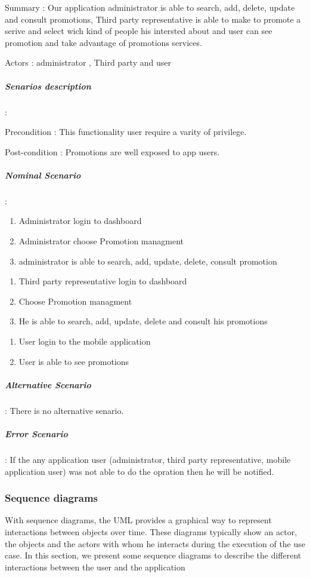 Summary : Our application administrator is able to search, add, delete, update and consult promotions,
Third party representative is able to make to promote a serive and select wich kind of people his intersted about and
user can see promotion and take advantage of promotions services.

Actors : administrator , Third party and user

\subparagraph{Senarios description} :
\label{sec:sec01}

Precondition : This functionality user require a varity of privilege.

Post-condition : Promotions are well exposed to app users.

\subparagraph{Nominal Scenario} :
\label{sec:sec01}

 \begin{enumerate}
   \item Administrator login to dashboard
   \item Administrator choose Promotion managment
   \item administrator is able to search, add, update, delete, consult promotion
 \end{enumerate}

 \begin{enumerate}
   \item Third party representative login to dashboard
   \item Choose Promotion managment
   \item He is able to search, add, update, delete and consult his promotions
 \end{enumerate}

 \begin{enumerate}
   \item User login to the mobile application
   \item User is able to see promotions
 \end{enumerate}


\subparagraph{Alternative Scenario} :
\label{sec:sec01}
There is no alternative senario.
\subparagraph{Error Scenario} :
\label{sec:sec01}
If the any application user (administrator, third party representative, mobile application user) was not able to do the opration then he will be notified.

\newpage
\subsubsection{Sequence diagrams}
\label{sec:sec01}
With sequence diagrams, the UML provides a graphical way to represent interactions between objects over time. These diagrams typically show an actor, the objects and the actors with whom he interacts during the execution of the use case. In this section, we present some sequence diagrams to describe the different interactions between the user and the application

